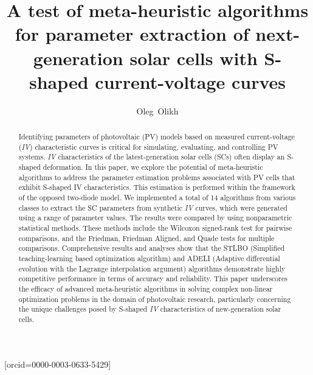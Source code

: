 \documentclass[a4paper,fleqn]{cas-sc}
\begin{document}
\let\WriteBookmarks\relax
\def\floatpagepagefraction{1}
\def\textpagefraction{.001}




\title [mode = title]{A test of meta-heuristic algorithms for parameter extraction of next-generation solar cells with S-shaped current-voltage curves}

\author{Oleg~Olikh}[orcid=0000-0003-0633-5429]






\begin{abstract}
Identifying parameters of photovoltaic (PV) models based on measured current-voltage (\emph{IV}) characteristic curves is critical for simulating, evaluating, and controlling PV systems.
\emph{IV} characteristics of the latest-generation solar cells (SCs) often display an S-shaped deformation.
In this paper, we explore the potential of meta-heuristic algorithms to address the parameter estimation problems
associated with PV cells that exhibit S-shaped IV characteristics.
This estimation is performed within the framework of the opposed two-diode model.
We implemented a total of 14 algorithms from various classes to extract the SC parameters
from synthetic \emph{IV} curves, which were generated using a range of parameter values.
The results were compared by using nonparametric statistical methods.
These methods include the Wilcoxon signed-rank test for pairwise comparisons, and the Friedman, Friedman Aligned, and Quade tests for multiple comparisons.
Comprehensive results and analyses show that the STLBO (Simplified teaching-learning based optimization algorithm) and ADELI (Adaptive differential evolution with the Lagrange interpolation argument) algorithms demonstrate highly competitive performance in terms of accuracy and reliability.
This paper underscores the efficacy of advanced meta-heuristic algorithms in solving complex non-linear optimization problems in the domain of photovoltaic research, particularly concerning the unique challenges posed by S-shaped \emph{IV} characteristics of new-generation solar cells.
\end{abstract}
\end{document}
